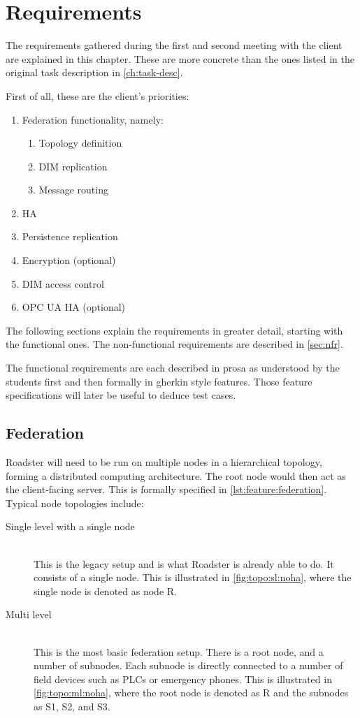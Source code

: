 \chapter{Requirements}\label{ch:reqs}
The requirements gathered during the first and second meeting with the client are
explained in this chapter. These are more concrete than the ones listed in the
original task description in \autoref{ch:task-desc}.

First of all, these are the client's priorities:

\begin{enumerate}
\item Federation functionality, namely:
	\begin{enumerate}
		\item Topology definition
		\item DIM replication
		\item Message routing
	\end{enumerate}
\item \Gls{HA}
\item Persistence replication
\item Encryption (optional)
\item DIM access control
\item OPC UA \gls{HA} (optional)
\end{enumerate}

The following sections explain the requirements in greater detail, starting
with the functional ones. The non-functional requirements are described in
\autoref{sec:nfr}.

The functional requirements are each described in prosa as understood by the
students first and then formally in \gls{gherkin} style features. Those feature
specifications will later be useful to deduce test cases.

\section{Federation}
Roadster will need to be run on multiple nodes in a hierarchical topology,
forming a distributed computing architecture. The root node would then act as
the client-facing server. This is formally specified in
\autoref{lst:feature:federation}. Typical node topologies include:

\begin{description}
	\item [ Single level with a single node ] \hfill\\
		This is the legacy setup and is what Roadster is already able
		to do. It consists of a single node. This is illustrated in
		\autoref{fig:topo:sl:noha}, where the single node is denoted as node R.

	\item [ Multi level ] \hfill\\
		This is the most basic federation setup. There is a root node, and
		a number of subnodes. Each subnode is directly connected to a number of field devices such as
		\glspl{PLC} or emergency phones. This is illustrated in
		\autoref{fig:topo:ml:noha}, where the root node is denoted as R
		and the subnodes as S1, S2, and S3.
\end{description}

